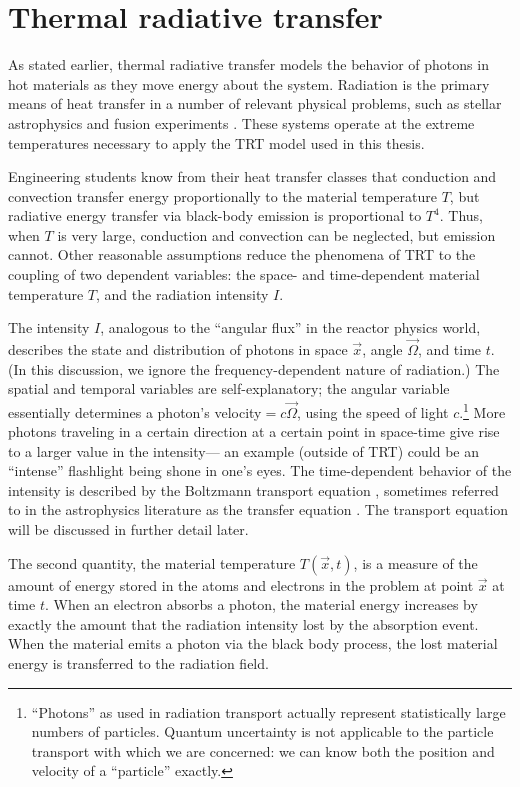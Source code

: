 \section{Thermal radiative transfer}

As stated earlier, thermal radiative transfer models the behavior of
photons in hot materials as they move energy about the system. Radiation is the
primary means of
heat transfer in a number of relevant physical problems, such as stellar
astrophysics and fusion experiments \cite{Pom1973,Mih1984}. These systems
operate at the extreme
temperatures necessary to apply the TRT model used in this thesis.

Engineering students know from their heat transfer classes that conduction and
convection transfer energy proportionally to the material
temperature $T$, but radiative energy transfer via black-body emission is
proportional to $T^4$. Thus, when $T$ is very large, conduction and convection
can be neglected, but emission cannot. Other reasonable assumptions
reduce the phenomena of
TRT to the coupling of two dependent variables: the space- and time-dependent material
temperature $T$, and the radiation intensity $I$.

The intensity $I$, analogous to the ``angular flux'' in the reactor physics
world,
describes the state and distribution of photons in space $\vec{x}$, angle
$\vec{\Omega}$, and time $t$.
(In this discussion, we ignore the frequency-dependent nature of radiation.)
The spatial and temporal variables are self-explanatory; the angular
variable essentially determines a photon's velocity${}=c\vec{\Omega}$, using
the speed of light $c$.\footnote{%
``Photons'' as used in radiation transport actually represent statistically
large numbers of particles. Quantum uncertainty is not applicable to the
particle transport with which we are concerned: we can know both the position
and velocity of a ``particle'' exactly.}  
More photons traveling in a certain direction at a certain
point in space-time give rise to a larger value in the intensity---%
an example (outside of TRT) could be an ``intense'' flashlight being shone in
one's eyes.  The time-dependent behavior of the intensity is described by the
Boltzmann transport equation \cite{Dud1976}, sometimes referred to in the
astrophysics literature as the transfer equation \cite{Mih1984}.
The transport equation will be discussed in further detail later.

The second quantity, the material temperature $T(\vec{x},t)$, is a measure of
the amount
of energy stored in the atoms and electrons in the problem at point
$\vec{x}$ at time $t$. When an electron
absorbs a photon, the material energy increases by exactly the amount that the
radiation intensity lost by the absorption event. When the material emits a
photon via the black body process, the lost material energy is transferred to
the radiation field.

